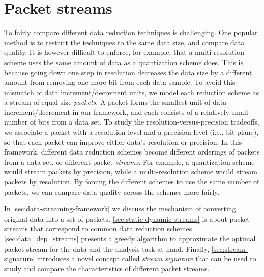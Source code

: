 \section{Packet streams}\label{sec:terminologies}

To fairly compare different data reduction techniques is challenging. One popular method is to
restrict the techniques to the same data size, and compare data quality. It is however difficult to
enforce, for example, that a multi-resolution scheme uses the same amount of data as a quantization
scheme does. This is because going down one step in resolution decreases the data size by a
different amount from removing one more bit from each data sample. To avoid this mismatch of data
increment/decrement units, we model each reduction scheme as a stream of equal-size \emph{packets}.
A packet forms the smallest unit of data increment/decrement in our framework, and each consists of
a relatively small number of bits from a data set. To study the resolution-versus-precision
tradeoffs, we associate a packet with a resolution level and a precision level (i.e., bit plane), so
that each packet can improve either data's resolution or precision. In this framework, different
data reduction schemes become different orderings of packets from a data set, or different packet
\emph{streams}. For example, a quantization scheme would stream packets by precision, while a
multi-resolution scheme would stream packets by resolution. By forcing the different schemes to use
the same number of packets, we can compare data quality across the schemes more fairly.

In \autoref{sec:data-streaming-framework} we discuss the mechanism of converting original data into
a set of packets. \autoref{sec:static-dynamic-streams} is about packet streams that correspond to
common data reduction schemes. \autoref{sec:data_dep_streams} presents a greedy algorithm to
approximate the optimal packet stream for the data and the analysis task at hand. Finally,
\autoref{sec:stream-signature} introduces a novel concept called \emph{stream signature} that can be
used to study and compare the characteristics of different packet streams.

